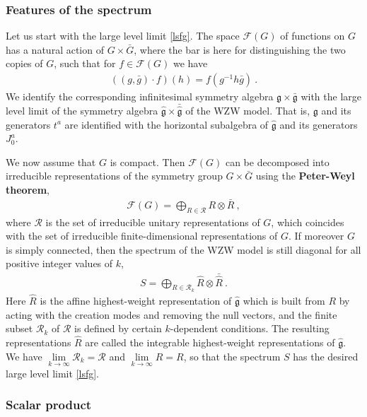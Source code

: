\documentclass[12pt, a4paper, notitlepage, twoside]{report}
\numberwithin{equation}{section}
\theoremstyle{break}
\begin{document}
\subsubsection{Features of the spectrum}

Let us start with the large level limit \eqref{lsfg}.
The space $\mathcal{F}(G)$ of functions on $G$ has a natural action of 
$G\times \bar{G}$, where the bar is here for distinguishing the two copies of $G$, such that for $f\in \mathcal{F}(G)$ we have 
\begin{align}
\left( (g,\bar{g})\cdot f\right)(h) = f(g^{-1}h\bar{g})\ .
\end{align}
We identify the corresponding infinitesimal symmetry algebra $\mathfrak{g}\times \bar{\mathfrak{g}}$ with the large level limit of the symmetry algebra $\hat{\mathfrak{g}}\times \bar{\hat{\mathfrak{g}}}$ of the WZW model.
That is, $\mathfrak{g}$ and its generators $t^a$ are identified with the horizontal subalgebra of $\hat{\mathfrak{g}}$ and its generators $J^a_0$.

We now assume that $G$ is compact.
Then $\mathcal{F}(G)$ can be decomposed into irreducible representations of the symmetry group $G\times \bar{G}$ using the \textbf{\boldmath Peter-Weyl theorem}, 
\begin{align}
 \mathcal{F}(G) = \bigoplus_{R\in \mathcal{R}} R\otimes \bar{R}\ ,
\end{align}
where $\mathcal{R}$ is the set of irreducible unitary representations of $G$, which coincides with the set of irreducible finite-dimensional representations of $G$.
If moreover $G$ is simply connected, then the spectrum of the WZW model is still diagonal for all positive integer values of $k$, \cite{fms97}
\begin{align}
 S = \bigoplus_{R\in \mathcal{R}_k} \hat{R}\otimes \bar{\hat{R}}\ .
\end{align}
Here $\hat{R}$ is the affine highest-weight representation of $\hat{\mathfrak{g}}$ which is built from $R$ by acting with the creation modes and removing the null vectors, and the finite subset $\mathcal{R}_k$ of $\mathcal{R}$ is defined by certain $k$-dependent conditions.
The resulting representations $\hat{R}$ are called the integrable highest-weight representations of $\hat{\mathfrak{g}}$. 
We have $\underset{k\to\infty}{\lim} \mathcal{R}_k =\mathcal{R}$ and $\underset{k\to \infty}{\lim} \hat{R} = R$, so that the spectrum $S$ has the desired large level limit \eqref{lsfg}.

\subsubsection{Scalar product}
\end{document}
